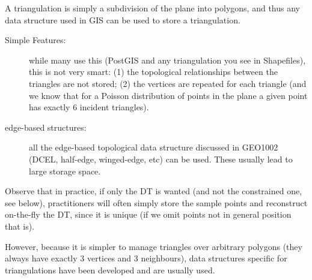 A triangulation is simply a subdivision of the plane into polygons, and thus any data structure used in GIS can be used to store a triangulation.

\begin{description}
  \item[Simple Features:] while many use this (PostGIS and any triangulation you see in Shapefiles), this is not very smart: (1) the topological relationships between the triangles are not stored; (2) the vertices are repeated for each triangle (and we know that for a Poisson distribution of points in the plane a given point has exactly 6 incident triangles).
  \item[edge-based structures:] all the edge-based topological data structure discussed in GEO1002 (DCEL, half-edge, winged-edge, etc) can be used. These usually lead to large storage space.
\end{description}

Observe that in practice, if only the DT is wanted (and not the constrained one, see below), practitioners will often simply store the sample points and reconstruct on-the-fly the DT, since it is unique (if we omit points not in general position that is).

However, because it is simpler to manage triangles over arbitrary polygons (they always have exactly 3 vertices and 3 neighbours), data structures specific for triangulations have been developed and are usually used.

